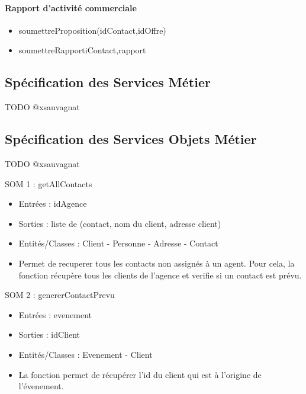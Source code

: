 \paragraph{Rapport d'activité commerciale}

\begin{itemize}
\item soumettreProposition(idContact,idOffre)
\item soumettreRapport{iContact,rapport}
\end{itemize}

\subsection{Spécification des Services Métier}

TODO @xsauvagnat

\subsection{Spécification des Services Objets Métier}

TODO @xsauvagnat

SOM 1 : getAllContacts
\begin{itemize}
\item Entrées : idAgence
\item Sorties : liste de (contact, nom du client, adresse client)
\item Entités/Classes : Client - Personne - Adresse - Contact
\item Permet de recuperer tous les contacts non assignés à un agent. Pour cela, la fonction récupère tous les clients de l'agence et verifie si un contact est prévu. 
\end{itemize}

SOM 2 : genererContactPrevu
\begin{itemize}
\item Entrées : evenement
\item Sorties : idClient
\item Entités/Classes : Evenement - Client
\item La fonction permet de récupérer l'id du client qui est à l'origine de l'évenement.
\end{itemize}
